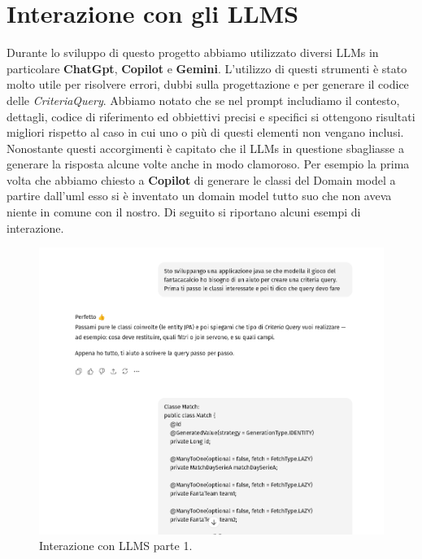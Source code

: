 \section{Interazione con gli LLMS}
Durante lo sviluppo di questo progetto abbiamo utilizzato diversi LLMs in particolare
\textbf{ChatGpt}, \textbf{Copilot} e \textbf{Gemini}. L'utilizzo di questi strumenti è stato molto 
utile per risolvere errori, dubbi sulla progettazione e per generare il codice delle \textit{CriteriaQuery}.
Abbiamo notato che se nel prompt includiamo il contesto, dettagli, codice di riferimento ed obbiettivi precisi e specifici
si ottengono risultati migliori rispetto al caso in cui uno o più di questi elementi non vengano inclusi.
Nonostante questi accorgimenti è capitato che il LLMs in questione sbagliasse a generare la risposta alcune volte anche in modo clamoroso.
Per esempio la prima volta che abbiamo chiesto a \textbf{Copilot} di generare le classi del Domain model a partire dall'uml esso 
si è inventato un domain model tutto suo che non aveva niente in comune con il nostro.
Di seguito si riportano alcuni esempi di interazione.
\begin{figure}
    \centering
    \includegraphics[width=\textwidth]{Resources/InterazioneLLMS/InterazioneParte1.png}        
    \caption{Interazione con LLMS parte 1.}
    \label{fig:interazione_con_LLMS_parte_1}
\end{figure}
